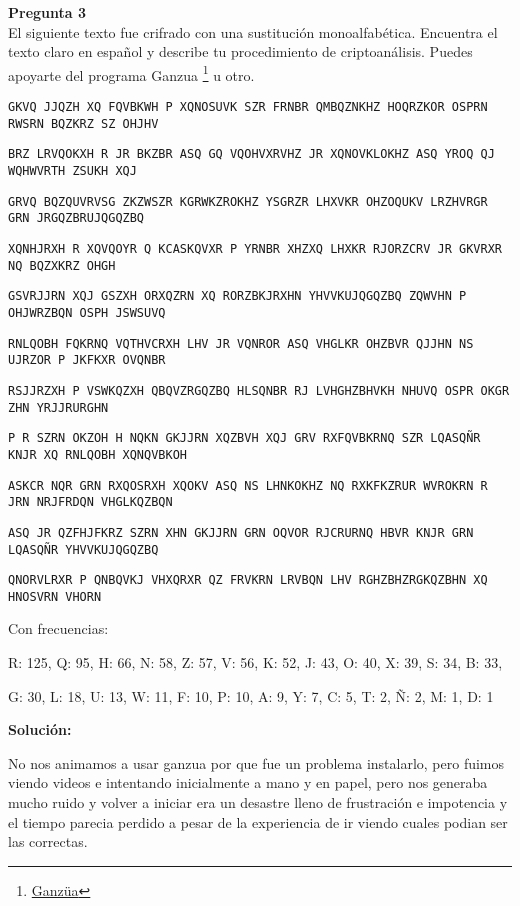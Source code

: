 \documentclass{article}
\newenvironment{problem}[2][Pregunta]
    { \begin{mdframed}[backgroundcolor=gray!20] \textbf{#1 #2} \\}
    {  \end{mdframed}}
\begin{document}
\newpage
\begin{problem}{3}
  El siguiente texto fue crifrado con una sustitución monoalfabética. Encuentra el texto claro en
  español y describe tu procedimiento de criptoanálisis. Puedes apoyarte del programa Ganzua
  \footnote{\href{https://ganzua.sourceforge.net/en/index.html}{Ganzüa}} u otro.

  \small
  {\tt GKVQ JJQZH XQ FQVBKWH P XQNOSUVK SZR FRNBR QMBQZNKHZ HOQRZKOR OSPRN RWSRN BQZKRZ SZ OHJHV}
  
  {\tt BRZ LRVQOKXH R JR BKZBR ASQ GQ VQOHVXRVHZ JR XQNOVKLOKHZ ASQ YROQ QJ WQHWVRTH ZSUKH XQJ}
  
  {\tt GRVQ BQZQUVRVSG ZKZWSZR KGRWKZROKHZ YSGRZR LHXVKR OHZOQUKV LRZHVRGR GRN JRGQZBRUJQGQZBQ}
  
  {\tt XQNHJRXH R XQVQOYR Q KCASKQVXR P YRNBR XHZXQ LHXKR RJORZCRV JR GKVRXR NQ BQZXKRZ OHGH}
  
  {\tt GSVRJJRN XQJ GSZXH ORXQZRN XQ RORZBKJRXHN YHVVKUJQGQZBQ ZQWVHN P OHJWRZBQN OSPH JSWSUVQ}
  
  {\tt RNLQOBH FQKRNQ VQTHVCRXH LHV JR VQNROR ASQ VHGLKR OHZBVR QJJHN NS UJRZOR P JKFKXR OVQNBR}
  
  {\tt RSJJRZXH P VSWKQZXH QBQVZRGQZBQ HLSQNBR RJ LVHGHZBHVKH NHUVQ OSPR OKGR ZHN YRJJRURGHN}

  {\tt P R SZRN OKZOH H NQKN GKJJRN XQZBVH XQJ GRV RXFQVBKRNQ SZR LQASQÑR KNJR XQ RNLQOBH XQNQVBKOH}
  
  {\tt ASKCR NQR GRN RXQOSRXH XQOKV ASQ NS LHNKOKHZ NQ RXKFKZRUR WVROKRN R JRN NRJFRDQN VHGLKQZBQN}
  
  {\tt ASQ JR QZFHJFKRZ SZRN XHN GKJJRN GRN OQVOR RJCRURNQ HBVR KNJR GRN LQASQÑR YHVVKUJQGQZBQ}

  {\tt QNORVLRXR P QNBQVKJ VHXQRXR QZ FRVKRN LRVBQN LHV RGHZBHZRGKQZBHN XQ HNOSVRN VHORN}

  \normalfont

  Con frecuencias:

  \ttfamily
  R: 125, Q: 95, H: 66, N: 58, Z: 57, V: 56, K: 52, J: 43, O: 40, X: 39, S: 34, B: 33,
  
  G: 30, L: 18, U: 13, W: 11, F: 10, P: 10, A: 9, Y: 7, C: 5, T: 2, Ñ: 2, M: 1, D: 1

  \normalfont
\end{problem}

{\bf Solución:}

No nos animamos a usar ganzua por que fue un problema instalarlo, pero fuimos viendo
videos e intentando inicialmente a mano y en papel, pero nos generaba mucho ruido y
volver a iniciar era un desastre lleno de frustración e impotencia y el tiempo parecia perdido a pesar
de la experiencia de ir viendo cuales podian ser las correctas.
\end{document}
